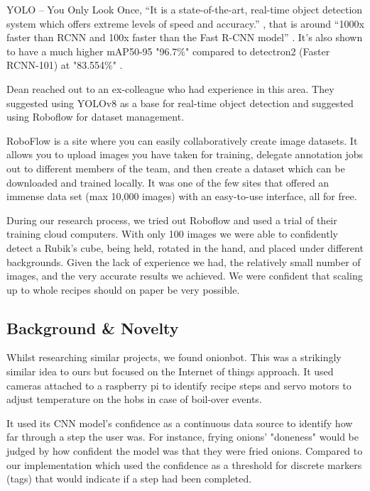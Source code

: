 \documentclass{article}
\begin{document}
YOLO – You Only Look Once, “It is a state-of-the-art, real-time object detection system which offers extreme levels of speed and accuracy.” \cite{rajeshwari2019object}, that is around “1000x faster than RCNN and 100x faster than the Fast R-CNN model” \cite{rajeshwari2019object}.  It's also shown to have a much higher mAP50-95 "96.7\%" compared to detectron2 (Faster RCNN-101) at "83.554\%" \cite{ai5010005}.

Dean reached out to an ex-colleague who had experience in this area. They suggested using YOLOv8 \cite{Jocher_Ultralytics_YOLO_2023} as a base for real-time object detection and suggested using Roboflow \cite{RoboFlow-Software} for dataset management.

RoboFlow \cite{RoboFlow-Software} is a site where you can easily collaboratively create image datasets. It allows you to upload images you have taken for training, delegate annotation jobs out to different members of the team, and then create a dataset which can be downloaded and trained locally. It was one of the few sites that offered an immense data set (max 10,000 images) with an easy-to-use interface, all for free.

During our research process, we tried out Roboflow and used a trial of their training cloud computers. With only 100 images we were able to confidently detect a Rubik's cube, being held, rotated in the hand, and placed under different backgrounds. Given the lack of experience we had, the relatively small number of images, and the very accurate results we achieved. We were confident that scaling up to whole recipes should on paper be very possible.

\subsection{Background \& Novelty}
Whilst researching similar projects, we found onionbot\cite{cobley2020onionbot}\cite{OnionBot-github}. This was a strikingly similar idea to ours but focused on the Internet of things approach. It used cameras attached to a raspberry pi to identify recipe steps and servo motors to adjust temperature on the hobs in case of boil-over events.

It used its CNN model’s confidence as a continuous data source to identify how far through a step the user was. For instance, frying onions' "doneness" would be judged by how confident the model was that they were fried onions. Compared to our implementation which used the confidence as a threshold for discrete markers (tags) that would indicate if a step had been completed.
\end{document}
